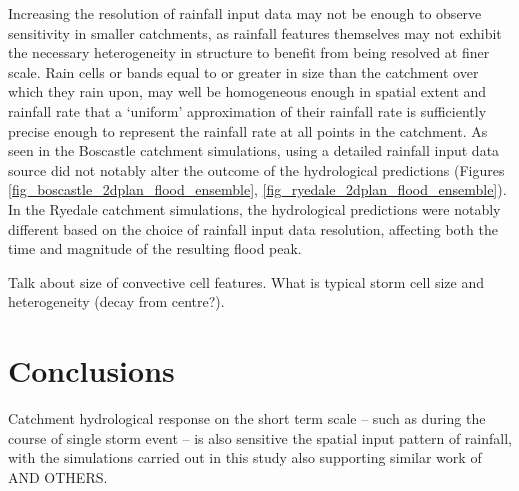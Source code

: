 Increasing the resolution of rainfall input data may not be enough to observe sensitivity in smaller catchments, as rainfall features themselves may not exhibit the necessary heterogeneity in structure to benefit from being resolved at finer scale. Rain cells or bands equal to or greater in size than the catchment over which they rain upon, may well be homogeneous enough in spatial extent and rainfall rate that a `uniform' approximation of their rainfall rate is sufficiently precise enough to represent the rainfall rate at all points in the catchment. As seen in the Boscastle catchment simulations, using a detailed rainfall input data source did not notably alter the outcome of the hydrological predictions (Figures \ref{fig_boscastle_2dplan_flood_ensemble}, \ref{fig_ryedale_2dplan_flood_ensemble}). In the Ryedale catchment simulations, the hydrological predictions were notably different based on the choice of rainfall input data resolution, affecting both the time and magnitude of the resulting flood peak. 

Talk about size of convective cell features. What is typical storm cell size and heterogeneity (decay from centre?).


\section{Conclusions}  %
Catchment hydrological response on the short term scale -- such as during the course of single storm event -- is also sensitive the spatial input pattern of rainfall, with the simulations carried out in this study also supporting similar work of \citep{nicotina2008impact} AND OTHERS.

